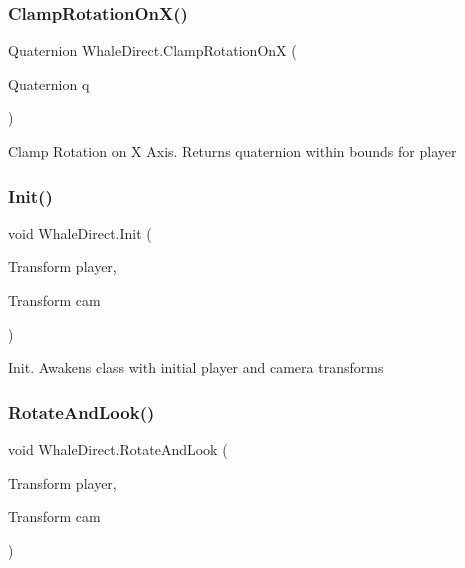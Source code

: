 \subsubsection{\texorpdfstring{Clamp\+Rotation\+On\+X()}{ClampRotationOnX()}}
{\footnotesize\ttfamily Quaternion Whale\+Direct.\+Clamp\+Rotation\+OnX (\begin{DoxyParamCaption}\item[{Quaternion}]{q }\end{DoxyParamCaption})\hspace{0.3cm}{\ttfamily [private]}}



Clamp Rotation on X Axis. Returns quaternion within bounds for player 

\mbox{\label{class_whale_direct_a782d4d5e42b0f197080b4bc703cd83a9}} 
\subsubsection{\texorpdfstring{Init()}{Init()}}
{\footnotesize\ttfamily void Whale\+Direct.\+Init (\begin{DoxyParamCaption}\item[{Transform}]{player,  }\item[{Transform}]{cam }\end{DoxyParamCaption})}



Init. Awakens class with initial player and camera transforms 

\mbox{\label{class_whale_direct_a726224202ede10e4d812468509537e3f}} 
\subsubsection{\texorpdfstring{Rotate\+And\+Look()}{RotateAndLook()}}
{\footnotesize\ttfamily void Whale\+Direct.\+Rotate\+And\+Look (\begin{DoxyParamCaption}\item[{Transform}]{player,  }\item[{Transform}]{cam }\end{DoxyParamCaption})}



